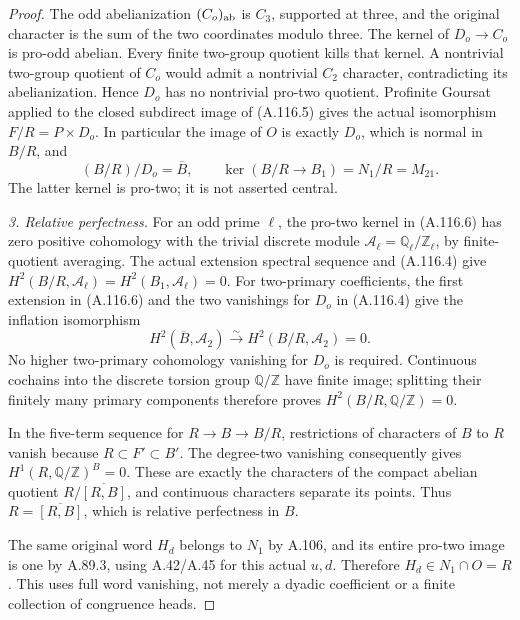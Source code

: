 \begin{proof}
The odd abelianization \((C_o)_{\rm ab}\) is \(C_3\), supported at
three, and the original character is the sum of the two coordinates
modulo three. The kernel of \(D_o\to C_o\) is pro-odd abelian.
Every finite two-group quotient kills that kernel. A nontrivial
two-group quotient of \(C_o\) would admit a nontrivial \(C_2\)
character, contradicting its abelianization. Hence \(D_o\) has no
nontrivial pro-two quotient. Profinite Goursat applied to the closed
subdirect image of (A.116.5) gives the actual isomorphism
\(F/R=P\times D_o\). In particular the image of \(O\) is exactly
\(D_o\), which is normal in \(B/R\), and
\[
 (B/R)/D_o=\overline B,\qquad
 \ker(B/R\to B_1)=N_1/R=M_{21}.
                                                                  \tag{A.116.6}
\]
The latter kernel is pro-two; it is not asserted central.

\medskip\noindent\emph{3. Relative perfectness.}
For an odd prime \(\ell\), the pro-two kernel in (A.116.6) has zero
positive cohomology with the trivial discrete module
\(\mathcal A_\ell=\mathbb Q_\ell/\mathbb Z_\ell\), by finite-quotient
averaging. The actual extension spectral sequence and (A.116.4) give
\(H^2(B/R,\mathcal A_\ell)=H^2(B_1,\mathcal A_\ell)=0\).
For two-primary coefficients, the first extension in (A.116.6)
and the two vanishings for \(D_o\) in (A.116.4) give the inflation
isomorphism
\[
 H^2(\overline B,\mathcal A_2)\xrightarrow{\sim}
 H^2(B/R,\mathcal A_2)=0.
\]
No higher two-primary cohomology vanishing for \(D_o\) is required.
Continuous cochains into the discrete torsion group \(\mathbb Q/\mathbb Z\)
have finite image; splitting their finitely many primary components
therefore proves
\(H^2(B/R,\mathbb Q/\mathbb Z)=0\).

In the five-term sequence for \(R\to B\to B/R\), restrictions of
characters of \(B\) to \(R\) vanish because \(R\subset F'\subset B'\).
The degree-two vanishing consequently gives
\(H^1(R,\mathbb Q/\mathbb Z)^B=0\).
These are exactly the characters of the compact abelian quotient
\(R/\overline{[R,B]}\), and continuous characters separate its points.
Thus \(R=\overline{[R,B]}\), which is relative perfectness in \(B\).

The same original word \(H_d\) belongs to \(N_1\) by A.106, and its
entire pro-two image is one by A.89.3, using A.42/A.45 for this actual
\(u,d\). Therefore \(H_d\in N_1\cap O=R\).
This uses full word vanishing, not merely a dyadic coefficient or a
finite collection of congruence heads.


\end{proof}
